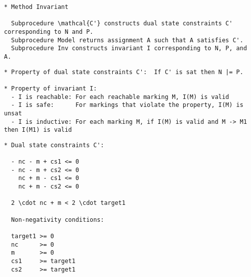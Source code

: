 \documentclass{article}
\begin{document}
\begin{verbatim}
* Method Invariant

  Subprocedure \mathcal{C'} constructs dual state constraints C' corresponding to N and P.
  Subprocedure Model returns assignment A such that A satisfies C'.
  Subprocedure Inv constructs invariant I corresponding to N, P, and A.
\end{verbatim}

\begin{center}
\end{center}

\begin{verbatim}
* Property of dual state constraints C':  If C' is sat then N |= P.

* Property of invariant I:
  - I is reachable: For each reachable marking M, I(M) is valid
  - I is safe:      For markings that violate the property, I(M) is unsat
  - I is inductive: For each marking M, if I(M) is valid and M -> M1 then I(M1) is valid
\end{verbatim}

\newpage
\begin{verbatim}
* Dual state constraints C':

  - nc - m + cs1 <= 0
  - nc - m + cs2 <= 0
    nc + m - cs1 <= 0
    nc + m - cs2 <= 0

  2 \cdot nc + m < 2 \cdot target1

  Non-negativity conditions:

  target1 >= 0
  nc      >= 0
  m       >= 0
  cs1     >= target1
  cs2     >= target1
\end{verbatim}
\end{document}
